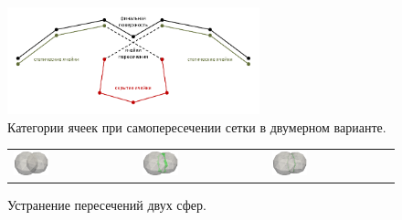\begin{figure}[ht]
\centering
\includegraphics[width=0.65\textwidth]{pics/text_1_int/faces-categories.pdf}
\singlespacing
{}\caption{Категории ячеек при самопересечении сетки в двумерном варианте.}\label{fig:text_1_int_faces_categories}
\end{figure}

\begin{figure}[ht]
\centering
\begin{tabular}{lll}
\includegraphics[width=0.3\textwidth]{./pics/text_1_int/pic_zip_01.png}
&
\includegraphics[width=0.3\textwidth]{./pics/text_1_int/pic_zip_09.png}
&
\includegraphics[width=0.3\textwidth]{./pics/text_1_int/pic_zip_15.png}
\end{tabular}
\singlespacing
{}\caption{Устранение пересечений двух сфер.}
\label{fig:text_1_int_spheres}
\end{figure}

